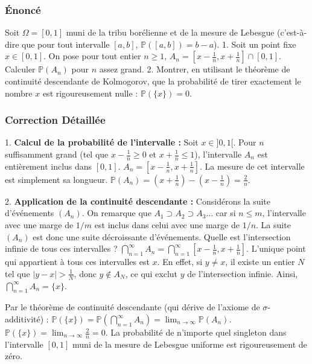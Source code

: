 \documentclass[11pt,a4paper]{article}
\begin{document}
\subsubsection*{Énoncé}

Soit $\Omega = [0, 1]$ muni de la tribu borélienne et de la mesure de Lebesgue (c'est-à-dire que pour tout intervalle $[a, b]$, $\mathbb{P}([a, b]) = b - a$).
1. Soit un point fixe $x \in [0, 1]$. On pose pour tout entier $n \ge 1$, $A_n = [x - \frac{1}{n}, x + \frac{1}{n}] \cap [0, 1]$. Calculer $\mathbb{P}(A_n)$ pour $n$ assez grand.
2. Montrer, en utilisant le théorème de continuité descendante de Kolmogorov, que la probabilité de tirer exactement le nombre $x$ est rigoureusement nulle : $\mathbb{P}(\{x\}) = 0$.


\subsubsection*{Correction Détaillée}

1. \textbf{Calcul de la probabilité de l'intervalle :}
Soit $x \in ]0, 1[$. Pour $n$ suffisamment grand (tel que $x - \frac{1}{n} \ge 0$ et $x + \frac{1}{n} \le 1$), l'intervalle $A_n$ est entièrement inclus dans $[0, 1]$.
$A_n = [x - \frac{1}{n}, x + \frac{1}{n}]$.
La mesure de cet intervalle est simplement sa longueur.
$\mathbb{P}(A_n) = \left(x + \frac{1}{n}\right) - \left(x - \frac{1}{n}\right) = \frac{2}{n}$.

2. \textbf{Application de la continuité descendante :}
Considérons la suite d'événements $(A_n)$.
On remarque que $A_1 \supset A_2 \supset A_3 \dots$ car si $n \le m$, l'intervalle avec une marge de $1/m$ est inclus dans celui avec une marge de $1/n$.
La suite $(A_n)$ est donc une suite décroissante d'événements.
Quelle est l'intersection infinie de tous ces intervalles ?
$\bigcap_{n=1}^\infty A_n = \bigcap_{n=1}^\infty [x - \frac{1}{n}, x + \frac{1}{n}]$.
L'unique point qui appartient à tous ces intervalles est $x$. En effet, si $y \neq x$, il existe un entier $N$ tel que $|y - x| > \frac{1}{N}$, donc $y \notin A_N$, ce qui exclut $y$ de l'intersection infinie.
Ainsi, $\bigcap_{n=1}^\infty A_n = \{x\}$.

Par le théorème de continuité descendante (qui dérive de l'axiome de $\sigma$-additivité) :
$\mathbb{P}(\{x\}) = \mathbb{P}\left(\bigcap_{n=1}^\infty A_n\right) = \lim_{n \to \infty} \mathbb{P}(A_n)$.
$\mathbb{P}(\{x\}) = \lim_{n \to \infty} \frac{2}{n} = 0$.
La probabilité de n'importe quel singleton dans l'intervalle $[0, 1]$ muni de la mesure de Lebesgue uniforme est rigoureusement de zéro.
\end{document}
